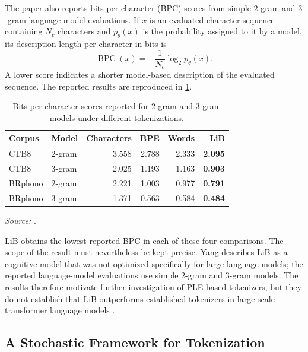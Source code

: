 The paper also reports bits-per-character (BPC) scores from simple \(2\)-gram and \(3\)-gram language-model evaluations. If \(x\) is an evaluated character sequence containing \(N_c\) characters and \(p_\theta(x)\) is the probability assigned to it by a model, its description length per character in bits is
\begin{equation}
    \operatorname{BPC}(x)
    =
    -\frac{1}{N_c}\log_2 p_\theta(x).
    \label{eq:tokenizer-bpc}
\end{equation}
A lower score indicates a shorter model-based description of the evaluated sequence. The reported results are reproduced in \cref{tab:tokenizer-lib-bpc}.

\begin{table}[htbp]
    \centering
    \caption{Bits-per-character scores reported for \(2\)-gram and \(3\)-gram models under different tokenizations.}
    \label{tab:tokenizer-lib-bpc}
    \small\begin{tabularx}{\textwidth}{lXrrrr}
        \toprule
        Corpus & Model & Characters & BPE & Words & LiB \\
        \midrule
        CTB8 & \(2\)-gram & 3.558 & 2.788 & 2.333 & \textbf{2.095} \\
        CTB8 & \(3\)-gram & 2.025 & 1.193 & 1.163 & \textbf{0.903} \\
        BRphono & \(2\)-gram & 2.221 & 1.003 & 0.977 & \textbf{0.791} \\
        BRphono & \(3\)-gram & 1.371 & 0.563 & 0.584 & \textbf{0.484} \\
        \bottomrule
    \end{tabularx}
    \par
    \smallskip
    \footnotesize\emph{Source:} \textcite{yang2024rethinking}.
\end{table}

LiB obtains the lowest reported BPC in each of these four comparisons. The scope of the result must nevertheless be kept precise. Yang describes LiB as a cognitive model that was not optimized specifically for large language models; the reported language-model evaluations use simple \(2\)-gram and \(3\)-gram models. The results therefore motivate further investigation of PLE-based tokenizers, but they do not establish that LiB outperforms established tokenizers in large-scale transformer language models \parencite{yang2024rethinking}.

\subsection{A Stochastic Framework for Tokenization}
\label{subsec:tokenizer-stochastic-framework}

